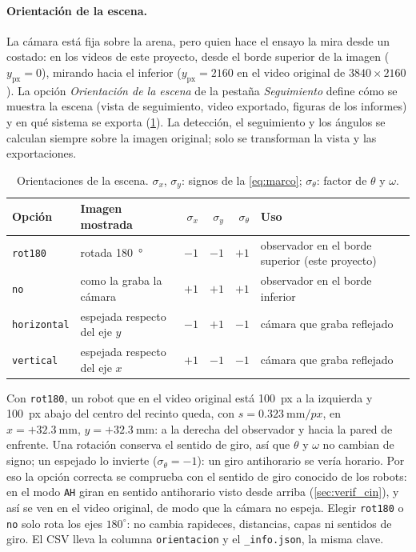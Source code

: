 \paragraph{Orientación de la escena.}\label{sec:orientacion} La cámara está fija sobre la arena, pero
quien hace el ensayo la mira desde un costado: en los videos de este proyecto, desde el borde superior de
la imagen ($y_{\mathrm{px}} = 0$), mirando hacia el inferior ($y_{\mathrm{px}} = 2160$ en el video
original de $3840\times2160$). La opción \emph{Orientación de la escena} de la pestaña \emph{Seguimiento}
define cómo se muestra la escena (vista de seguimiento, video exportado, figuras de los informes) y en qué
sistema se exporta (\cref{tab:orientacion}). La detección, el seguimiento y los ángulos se calculan
siempre sobre la imagen original; solo se transforman la vista y las exportaciones.

\begin{table}[H]
  \centering
  \caption{Orientaciones de la escena. $\sigma_x$, $\sigma_y$: signos de la \cref{eq:marco};
    $\sigma_\theta$: factor de $\theta$ y $\omega$.}
  \label{tab:orientacion}
  \small
  \begin{tabular}{@{}llrrrl@{}}
    \toprule
    Opción & Imagen mostrada & $\sigma_x$ & $\sigma_y$ & $\sigma_\theta$ & Uso \\
    \midrule
    \texttt{rot180} & rotada \SI{180}{\degree} & $-1$ & $-1$ & $+1$ & observador en el borde superior (este proyecto) \\
    \texttt{no} & como la graba la cámara & $+1$ & $+1$ & $+1$ & observador en el borde inferior \\
    \texttt{horizontal} & espejada respecto del eje $y$ & $-1$ & $+1$ & $-1$ & cámara que graba reflejado \\
    \texttt{vertical} & espejada respecto del eje $x$ & $+1$ & $-1$ & $-1$ & cámara que graba reflejado \\
    \bottomrule
  \end{tabular}
\end{table}

Con \texttt{rot180}, un robot que en el video original está \SI{100}{px} a la izquierda y \SI{100}{px}
abajo del centro del recinto queda, con $s = \SI{0.323}{\milli\metre\per px}$, en
$x = +\SI{32.3}{\milli\metre}$, $y = +\SI{32.3}{\milli\metre}$: a la derecha del observador y hacia la
pared de enfrente. Una rotación conserva el sentido de giro, así que $\theta$ y $\omega$ no cambian de
signo; un espejado lo invierte ($\sigma_\theta = -1$): un giro antihorario se vería horario. Por eso la
opción correcta se comprueba con el sentido de giro conocido de los robots: en el modo \texttt{AH} giran
en sentido antihorario visto desde arriba (\cref{sec:verif_cin}), y así se ven en el video original, de
modo que la cámara no espeja. Elegir \texttt{rot180} o \texttt{no} solo rota los ejes $180^\circ$: no
cambia rapideces, distancias, capas ni sentidos de giro. El CSV lleva la columna \texttt{orientacion} y
el \texttt{\_info.json}, la misma clave.

